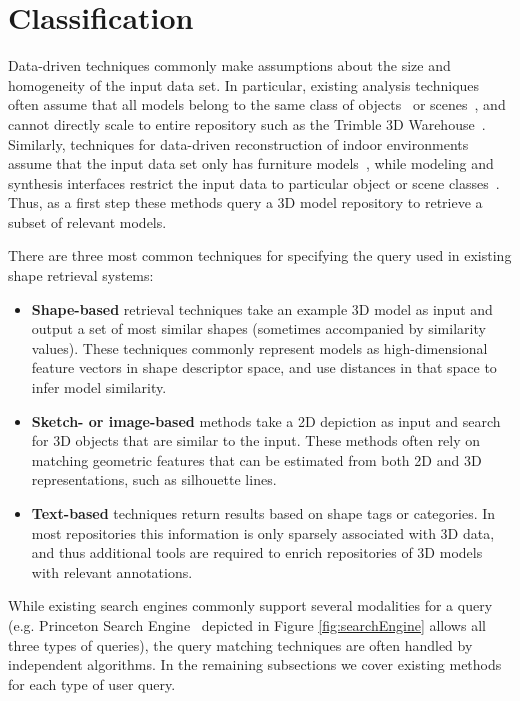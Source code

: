 \section{Classification}
\label{sec:classification}
Data-driven techniques commonly make assumptions about the size and homogeneity of the input data set. In particular, existing analysis techniques often assume that all models belong to the same class of objects~\cite{Kim:2013:lpt} or scenes~\cite{Fisher:2011:CSR}, and cannot directly scale to entire repository such as the Trimble 3D Warehouse~\cite{warehouse}. Similarly, techniques for data-driven reconstruction of indoor environments assume that the input data set only has furniture models~\cite{Nan:2012:SAC}, while modeling and synthesis interfaces restrict the input data to particular object or scene classes~\cite{Chaudhuri:2011:prabm,Kalogerakis:2012:PMC,Fisher:2012:CSR}.  Thus, as a first step these methods query a 3D model repository to retrieve a subset of relevant models.



There are three most common techniques for specifying the query used in existing shape retrieval systems:
%
\begin{itemize}
\item \textbf{Shape-based} retrieval techniques take an example 3D model as input and output a set of most similar shapes (sometimes accompanied by similarity values). These techniques commonly represent models as high-dimensional feature vectors in shape descriptor space, and use distances in that space to infer model similarity.
\item \textbf{Sketch- or image-based} methods take a 2D depiction as input and search for 3D objects that are similar to the input. These methods often rely on matching geometric features that can be estimated from both 2D and 3D representations, such as silhouette lines.
\item \textbf{Text-based} techniques return results based on shape tags or categories. In most repositories this information is only sparsely associated with 3D data, and thus additional tools are required to enrich repositories of 3D models with relevant annotations.
\end{itemize}


While existing search engines commonly support several modalities for a query (e.g. Princeton Search Engine~\cite{Funkhouser:2003:ASE} depicted in Figure \ref{fig:searchEngine} allows all three types of queries), the query matching techniques are often handled by independent algorithms. In the remaining subsections we cover existing methods for each type of user query.

